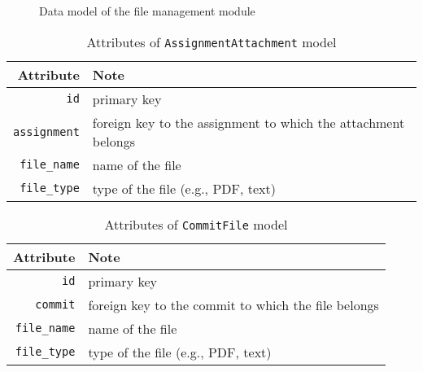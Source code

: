 \begin{figure}[ht]
    \centering
    \usetikzlibrary{er}


    \caption{Data model of the file management module}
    \label{fig:FILES_ER}
\end{figure}

\begin{table}[ht]
    \centering
    \caption{Attributes of \texttt{AssignmentAttachment} model}
    \label{tab:ATTACH_FILE_ATTR}
    \renewcommand{\arraystretch}{1.3}
    \begin{tabular}[ht]{r|l}
        \hline
        Attribute & Note \\
        \hline
        \hline
        \texttt{id} & primary key \\
        \hline
        \texttt{assignment} & foreign key to the assignment to which the
            attachment belongs \\
        \hline
        \texttt{file\_name} & name of the file\\
        \hline
        \texttt{file\_type} & type of the file (e.g., PDF, text) \\
        \hline
    \end{tabular}
\end{table}

\begin{table}[ht]
    \centering
    \caption{Attributes of \texttt{CommitFile} model}
    \label{tab:COMMIT_FILE_ATTR}
    \renewcommand{\arraystretch}{1.3}
    \begin{tabular}[ht]{r|l}
        \hline
        Attribute & Note \\
        \hline
        \hline
        \texttt{id} & primary key \\
        \hline
        \texttt{commit} & foreign key to the commit to which the file belongs \\
        \hline
        \texttt{file\_name} & name of the file \\
        \hline
        \texttt{file\_type} & type of the file (e.g., PDF, text) \\
        \hline
    \end{tabular}
\end{table}


